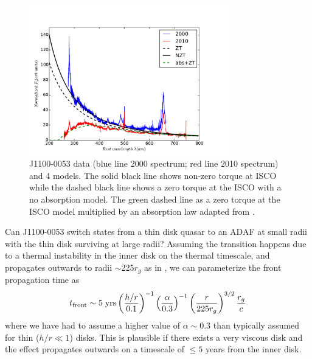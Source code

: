 \documentclass[a4paper,fleqn,usenatbib]{mnras}
\begin{document}
\begin{figure}
  \centering
\includegraphics[width=8.7cm, trim=0.2cm 0.2cm 1.4cm 0.6cm, clip]
{../plots/models/mcd_gap_v3_3_b1.pdf}
\vspace{-12pt}
  \caption[]{
J1100-0053 data (blue line 2000 spectrum; red line 2010 spectrum) and
4 models. The solid black line shows non-zero torque at ISCO
\citep[following] []{Afshordi_Paczynski2003} while the
dashed black line shows a zero torque at the ISCO with a no absorption model. 
The green dashed line as a zero torque at the ISCO model multiplied by an 
absorption law adapted from \citep{Guo2016}.   }
  \label{fig:disk_suppression}
\end{figure}
Can J1100-0053 switch states from a thin disk quasar to an ADAF at
small radii with the thin disk surviving at large radii?
Assuming the transition happens due to a thermal instability in the
inner disk on the thermal timescale, and propagates outwards to radii
$\sim$225$r_{g}$ as in \citet{Nemmen2006}, we can parameterize the
front propagation time as
\begin{equation}
    t_{\rm front}  \sim  5 \; {\rm yrs} \left(\frac{h/r}{0.1}\right)^{-1}
                                                           \left(\frac{\alpha}{0.3}\right)^{-1}  
                                                           \left(\frac{r}{225r_{g}}\right)^{3/2}  
                                                           \frac{r_{g}}{c}
\label{eqn:t_front}
\end{equation}
where we have had to assume a higher value of $\alpha \sim 0.3$
\citep{King2007} than typically assumed for thin ($h/r \ll 1$)
disks. This is plausible if there exists a very viscous disk and the
effect propagates outwards on a timescale of $\leq 5$ years from the
inner disk.
\end{document}
